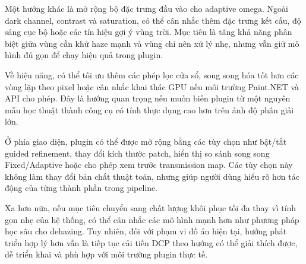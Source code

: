 Một hướng khác là mở rộng bộ đặc trưng đầu vào cho adaptive omega. Ngoài dark channel, contrast và saturation, có thể cân nhắc thêm đặc trưng kết cấu, độ sáng cục bộ hoặc các tín hiệu gợi ý vùng trời. Mục tiêu là tăng khả năng phân biệt giữa vùng cần khử haze mạnh và vùng chỉ nên xử lý nhẹ, nhưng vẫn giữ mô hình đủ gọn để chạy hiệu quả trong plugin.

Về hiệu năng, có thể tối ưu thêm các phép lọc cửa sổ, song song hóa tốt hơn các vòng lặp theo pixel hoặc cân nhắc khai thác GPU nếu môi trường Paint.NET và API cho phép. Đây là hướng quan trọng nếu muốn biến plugin từ một nguyên mẫu học thuật thành công cụ có tính thực dụng cao hơn trên ảnh độ phân giải lớn.

Ở phía giao diện, plugin có thể được mở rộng bằng các tùy chọn như bật/tắt guided refinement, thay đổi kích thước patch, hiển thị so sánh song song Fixed/Adaptive hoặc cho phép xem trước transmission map. Các tùy chọn này không làm thay đổi bản chất thuật toán, nhưng giúp người dùng hiểu rõ hơn tác động của từng thành phần trong pipeline.

Xa hơn nữa, nếu mục tiêu chuyển sang chất lượng khôi phục tối đa thay vì tính gọn nhẹ của hệ thống, có thể cân nhắc các mô hình mạnh hơn như phương pháp học sâu cho dehazing. Tuy nhiên, đối với phạm vi đồ án hiện tại, hướng phát triển hợp lý hơn vẫn là tiếp tục cải tiến DCP theo hướng có thể giải thích được, dễ triển khai và phù hợp với môi trường plugin thực tế.
